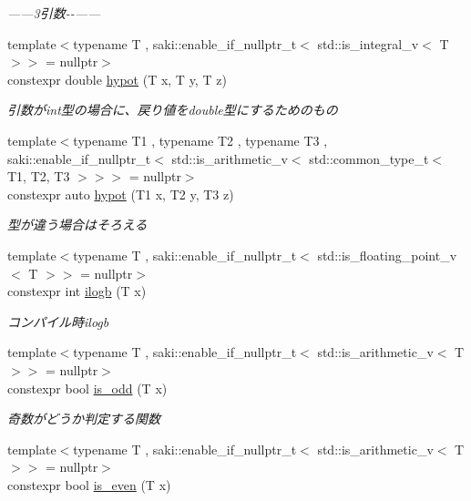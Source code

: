 \begin{DoxyCompactItemize}
\begin{DoxyCompactList}\small\item\em ------3引数-\/-\/------ \end{DoxyCompactList}\item 
{\footnotesize template$<$typename T , saki\+::enable\+\_\+if\+\_\+nullptr\+\_\+t$<$ std\+::is\+\_\+integral\+\_\+v$<$ T $>$$>$  = nullptr$>$ }\\constexpr double \mbox{\hyperlink{namespacesaki_ad56e1232bb063b3bc0e7cf2b3f655247}{hypot}} (T x, T y, T z)
\begin{DoxyCompactList}\small\item\em 引数がint型の場合に、戻り値をdouble型にするためのもの \end{DoxyCompactList}\item 
{\footnotesize template$<$typename T1 , typename T2 , typename T3 , saki\+::enable\+\_\+if\+\_\+nullptr\+\_\+t$<$ std\+::is\+\_\+arithmetic\+\_\+v$<$ std\+::common\+\_\+type\+\_\+t$<$ T1, T2, T3 $>$$>$$>$  = nullptr$>$ }\\constexpr auto \mbox{\hyperlink{namespacesaki_a210e4f63ae8c3ff62e53396f8ba45d91}{hypot}} (T1 x, T2 y, T3 z)
\begin{DoxyCompactList}\small\item\em 型が違う場合はそろえる \end{DoxyCompactList}\item 
{\footnotesize template$<$typename T , saki\+::enable\+\_\+if\+\_\+nullptr\+\_\+t$<$ std\+::is\+\_\+floating\+\_\+point\+\_\+v$<$ T $>$$>$  = nullptr$>$ }\\constexpr int \mbox{\hyperlink{namespacesaki_a582e9de82aa8572287c01530ae2626a8}{ilogb}} (T x)
\begin{DoxyCompactList}\small\item\em コンパイル時ilogb \end{DoxyCompactList}\item 
{\footnotesize template$<$typename T , saki\+::enable\+\_\+if\+\_\+nullptr\+\_\+t$<$ std\+::is\+\_\+arithmetic\+\_\+v$<$ T $>$$>$  = nullptr$>$ }\\constexpr bool \mbox{\hyperlink{namespacesaki_ae0752a8969900319135a2cb16bb98e2c}{is\+\_\+odd}} (T x)
\begin{DoxyCompactList}\small\item\em 奇数がどうか判定する関数 \end{DoxyCompactList}\item 
{\footnotesize template$<$typename T , saki\+::enable\+\_\+if\+\_\+nullptr\+\_\+t$<$ std\+::is\+\_\+arithmetic\+\_\+v$<$ T $>$$>$  = nullptr$>$ }\\constexpr bool \mbox{\hyperlink{namespacesaki_a9b20d1e721a18d69e8fa1e758be27818}{is\+\_\+even}} (T x)

\end{DoxyCompactItemize}
